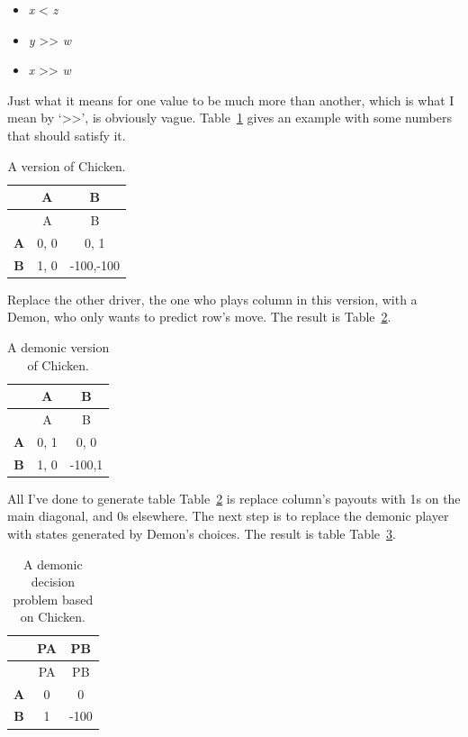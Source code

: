 \documentclass[
  12pt,
  letterpaper,
  DIV=11,
  numbers=noendperiod]{scrreprt}
\providecommand{\tightlist}{%
  \setlength{\itemsep}{0pt}\setlength{\parskip}{0pt}}\usepackage{longtable,booktabs,array}
\begin{document}
\begin{itemize}
\tightlist
\item
  \emph{x} \textless{} \emph{z}
\item
  \emph{y} \textgreater\textgreater{} \emph{w}
\item
  \emph{x} \textgreater\textgreater{} \emph{w}
\end{itemize}

Just what it means for one value to be much more than another, which is
what I mean by `\textgreater\textgreater{}', is obviously vague.
Table~\ref{tbl-basic-chicken} gives an example with some numbers that
should satisfy it.

\hypertarget{tbl-basic-chicken}{}
\begin{longtable}[]{@{}ccc@{}}
\caption{\label{tbl-basic-chicken}A version of Chicken.}\tabularnewline
\toprule\noalign{}
& A & B \\
\midrule\noalign{}
\endfirsthead
\toprule\noalign{}
& A & B \\
\midrule\noalign{}
\endhead
\bottomrule\noalign{}
\endlastfoot
\textbf{A} & 0, 0 & 0, 1 \\
\textbf{B} & 1, 0 & -100,-100 \\
\end{longtable}

Replace the other driver, the one who plays column in this version, with
a Demon, who only wants to predict row's move. The result is
Table~\ref{tbl-demon-chicken}.

\hypertarget{tbl-demon-chicken}{}
\begin{longtable}[]{@{}ccc@{}}
\caption{\label{tbl-demon-chicken}A demonic version of
Chicken.}\tabularnewline
\toprule\noalign{}
& A & B \\
\midrule\noalign{}
\endfirsthead
\toprule\noalign{}
& A & B \\
\midrule\noalign{}
\endhead
\bottomrule\noalign{}
\endlastfoot
\textbf{A} & 0, 1 & 0, 0 \\
\textbf{B} & 1, 0 & -100,1 \\
\end{longtable}

All I've done to generate table Table~\ref{tbl-demon-chicken} is replace
column's payouts with 1s on the main diagonal, and 0s elsewhere. The
next step is to replace the demonic player with states generated by
Demon's choices. The result is table Table~\ref{tbl-egan-game}.

\hypertarget{tbl-egan-game}{}
\begin{longtable}[]{@{}ccc@{}}
\caption{\label{tbl-egan-game}A demonic decision problem based on
Chicken.}\tabularnewline
\toprule\noalign{}
& PA & PB \\
\midrule\noalign{}
\endfirsthead
\toprule\noalign{}
& PA & PB \\
\midrule\noalign{}
\endhead
\bottomrule\noalign{}
\endlastfoot
\textbf{A} & 0 & 0 \\
\textbf{B} & 1 & -100 \\
\end{longtable}
\end{document}

